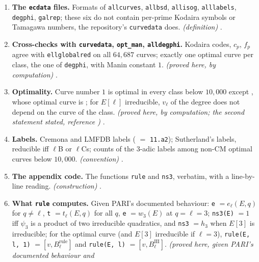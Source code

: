\begin{enumerate}[label=\textbf{\thechapter.\arabic*}]
marks the optimal curve by the Smith invariants $[1,1]$ (, ); the largest degrees below $10{,}000$ need a stack of $16$ to $32$ MB. \emph{(stated;
reference \cite{PARIusers}; examples proved here, by computation)} .
\item \textbf{The \texttt{ecdata} files.} Formats of \texttt{allcurves}, \texttt{allbsd}, \texttt{allisog}, \texttt{alllabels}, \texttt{degphi}, \texttt{galrep}; these six do not contain
per-prime Kodaira symbols or Tamagawa numbers, the repository's \texttt{curvedata} does. \emph{(definition)} .
\item \textbf{Cross-checks with \texttt{curvedata}, \texttt{opt\_man}, \texttt{alldegphi}.} Kodaira codes, $c_p$, $f_p$ agree with \texttt{ellglobalred} on all $64{,}687$
curves; exactly one optimal curve per class, the one of \texttt{degphi}, with Manin constant $1$. \emph{(proved here, by computation)} .
\item \textbf{Optimality.} Curve number $1$ is optimal in every class below $10{,}000$ except , whose optimal curve is ; for $E[\ell]$ irreducible,
$v_\ell$ of the degree does not depend on the curve of the class. \emph{(proved here, by computation; the second statement stated, reference )}
.
\item \textbf{Labels.} Cremona and LMFDB labels ( $=$ \texttt{11.a2}); Sutherland's labels, reducible iff $\ell$B or $\ell$Cs; counts of the $3$-adic labels
among non-CM optimal curves below $10{,}000$. \emph{(convention)} .
\item \textbf{The appendix code.} The functions \texttt{rule} and \texttt{ns3}, verbatim, with a line-by-line reading. \emph{(construction)}
.
\item \textbf{What \texttt{rule} computes.} Given PARI's documented behaviour: \texttt{e} $=e_\ell(E,q)$ for $q\ne\ell$, \texttt{t} $=t_\ell(E,q)$ for all $q$, \texttt{e} $=w_3(E)$ at $q=\ell=3$;
\texttt{ns3(E)} $=1$ iff $\psi_3$ is a product of two irreducible quadratics, and \texttt{ns3} $=h_3$ when $E[3]$ is irreducible; for the optimal curve (and $E[3]$
irreducible if $\ell=3$), \texttt{rule(E, l, 1)} $=[v,B^{\mathrm{rule}}_\ell]$ and \texttt{rule(E, l)} $=[v,B^{\mathrm{III}}_\ell]$. \emph{(proved here, given PARI's documented behaviour and
}
\end{enumerate}
